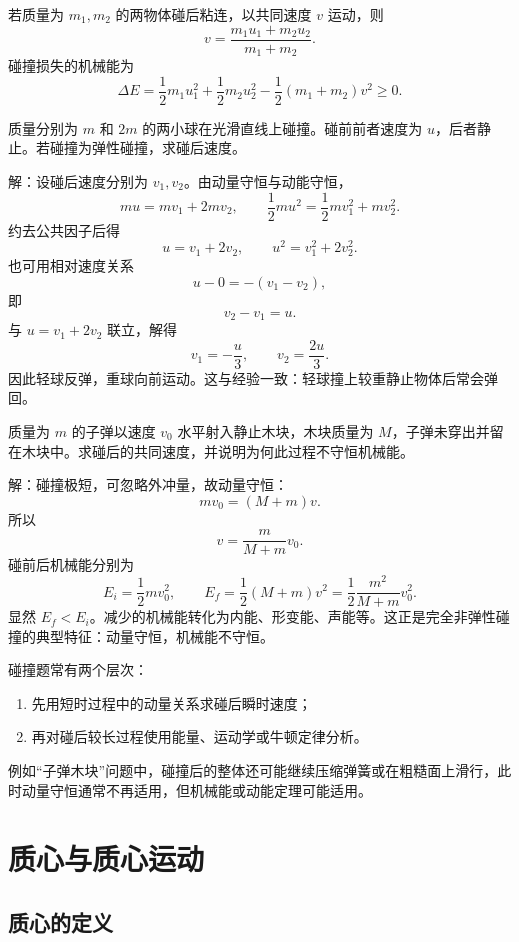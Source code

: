 \begin{theorem}[一维完全非弹性碰撞]
若质量为 $m_1,m_2$ 的两物体碰后粘连，以共同速度 $v$ 运动，则
\[
v=\frac{m_1u_1+m_2u_2}{m_1+m_2}.
\]
碰撞损失的机械能为
\[
\Delta E=\frac12 m_1u_1^2+\frac12 m_2u_2^2-\frac12 (m_1+m_2)v^2\ge 0.
\]
\end{theorem}

\begin{example}
质量分别为 $m$ 和 $2m$ 的两小球在光滑直线上碰撞。碰前前者速度为 $u$，后者静止。若碰撞为弹性碰撞，求碰后速度。

解：设碰后速度分别为 $v_1,v_2$。由动量守恒与动能守恒，
\[
mu=mv_1+2mv_2,
\qquad
\frac12 mu^2=\frac12 mv_1^2+m v_2^2.
\]
约去公共因子后得
\[
u=v_1+2v_2,
\qquad
u^2=v_1^2+2v_2^2.
\]
也可用相对速度关系
\[
u-0=-(v_1-v_2),
\]
即
\[
v_2-v_1=u.
\]
与 $u=v_1+2v_2$ 联立，解得
\[
v_1=-\frac{u}{3},\qquad v_2=\frac{2u}{3}.
\]
因此轻球反弹，重球向前运动。这与经验一致：轻球撞上较重静止物体后常会弹回。
\end{example}

\begin{example}
质量为 $m$ 的子弹以速度 $v_0$ 水平射入静止木块，木块质量为 $M$，子弹未穿出并留在木块中。求碰后的共同速度，并说明为何此过程不守恒机械能。

解：碰撞极短，可忽略外冲量，故动量守恒：
\[
mv_0=(M+m)v.
\]
所以
\[
v=\frac{m}{M+m}v_0.
\]
碰前后机械能分别为
\[
E_i=\frac12 mv_0^2,
\qquad
E_f=\frac12 (M+m)v^2=\frac12\frac{m^2}{M+m}v_0^2.
\]
显然 $E_f<E_i$。减少的机械能转化为内能、形变能、声能等。这正是完全非弹性碰撞的典型特征：动量守恒，机械能不守恒。
\end{example}

\begin{remark}
碰撞题常有两个层次：
\begin{enumerate}
  \item 先用短时过程中的动量关系求碰后瞬时速度；
  \item 再对碰后较长过程使用能量、运动学或牛顿定律分析。
\end{enumerate}
例如“子弹木块”问题中，碰撞后的整体还可能继续压缩弹簧或在粗糙面上滑行，此时动量守恒通常不再适用，但机械能或动能定理可能适用。
\end{remark}

\section{质心与质心运动}

\subsection{质心的定义}

